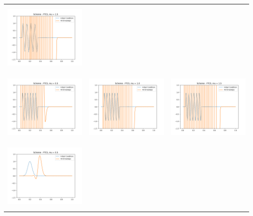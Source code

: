 \documentclass[a4paper,twoside,11pt]{article}
\begin{document}
\begin{table}[!h]
\begin{tabular}{ | c | m{5cm} | m{5cm} | }
\begin{minipage}{.3\textwidth}
          \includegraphics[width=\linewidth, height=3.5cm]{../plots/scheme2-IC3-mu1_5.png}
        \end{minipage} \\
        \begin{minipage}{.3\textwidth}
          \includegraphics[width=\linewidth, height=3.5cm]{../plots/scheme2-IC4-mu0_5.png}
        \end{minipage}
        &
        \begin{minipage}{.3\textwidth}
          \includegraphics[width=\linewidth, height=3.5cm]{../plots/scheme2-IC4-mu1_0.png}
        \end{minipage}
        &
        \begin{minipage}{.3\textwidth}
          \includegraphics[width=\linewidth, height=3.5cm]{../plots/scheme2-IC4-mu1_5.png}
        \end{minipage} \\
        \begin{minipage}{.3\textwidth}
          \includegraphics[width=\linewidth, height=3.5cm]{../plots/scheme2-IC5-mu0_5.png}

\end{minipage}
\end{tabular}
\end{table}
\end{document}
